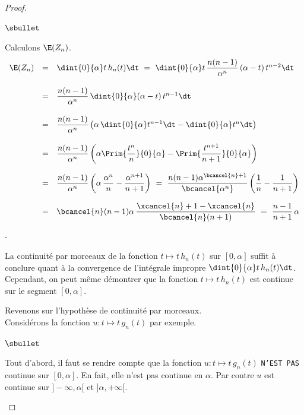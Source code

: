 \documentclass[11pt]{article}%
\begin{document}
\begin{proof}
\begin{noliste}{$\sbullet$}
	
	\item Calculons $\E(Z_n)$.
	\[
	  \begin{array}{rcl}
	    \E(Z_n) & = & \dint{0}{\alpha} t \, h_n(t) \dt \ = \
	    \dint{0}{\alpha} t \, \dfrac{n(n-1)}{\alpha^{n}} \,
	    (\alpha -t) \, t^{n-2} \dt
	    \\[.6cm]
	    & = & \dfrac{n(n-1)}{\alpha^{n}} \, \dint{0}{\alpha}
	    (\alpha -t) \, t^{n-1} \dt
	    \\[.6cm]
	    & = & \dfrac{n(n-1)}{\alpha^n} \left(\alpha \, 
	    \dint{0}{\alpha} t^{n-1} \dt - \dint{0}{\alpha} t^n \dt
	    \right)
	    \\[.6cm]
	    & = & \dfrac{n(n-1)}{\alpha^n} \left(\alpha 
	    \Prim{\dfrac{t^n}{n}}{0}{\alpha} - \Prim{\dfrac{t^{n+1}}
	    {n+1}}{0}{\alpha} \right)
	    \\[.6cm]
	    & = & \dfrac{n(n-1)}{\alpha^n} \left( \alpha \, 
	    \dfrac{\alpha^n}{n} - \dfrac{\alpha^{n+1}}{n+1} \right)
	    \ = \ \dfrac{n(n-1)\alpha^{\bcancel{n}+1}}
	    {\bcancel{\alpha^n}}\left(\dfrac{1}{n} - \dfrac{1}{n+1}
	    \right)
	    \\[.6cm]
	    & = & \bcancel{n}(n-1) \alpha \, \dfrac{\xcancel{n} +1
	    -\xcancel{n}}{\bcancel{n}(n+1)}
	    \ = \ \dfrac{n-1}{n+1} \, \alpha
	  \end{array}
	\]
      \end{noliste}
      
      \begin{remarkL}{.97}%
      \begin{noliste}{-}
        \item La continuité par morceaux de la fonction $t \mapsto 
        t \, h_n(t)$ sur $[0,\alpha]$ suffit à conclure quant à la 
	convergence de l'intégrale impropre $\dint{0}{\alpha}
	t \, h_n(t) \dt$.\\
	Cependant, on peut même démontrer que la 
	fonction $t \mapsto t \, h_n(t)$ est continue sur le segment 
	$[0,\alpha]$.
        
        \item Revenons sur l'hypothèse de continuité par morceaux.\\
        Considérons la fonction $u : t \mapsto t \, g_n(t)$ par exemple.
        \begin{noliste}{$\sbullet$}
        \item Tout d'abord, il faut se rendre compte que la fonction
          $u : t \mapsto t \, g_n(t)$ {\tt N'EST PAS} continue sur
          $[0, \alpha]$. En fait, elle n'est pas continue en
          $\alpha$. Par contre $u$ est continue sur
          $]-\infty, \alpha[$ et $]\alpha, +\infty[$.


\end{noliste}
\end{noliste}
\end{remarkL}
\end{proof}
\end{document}
